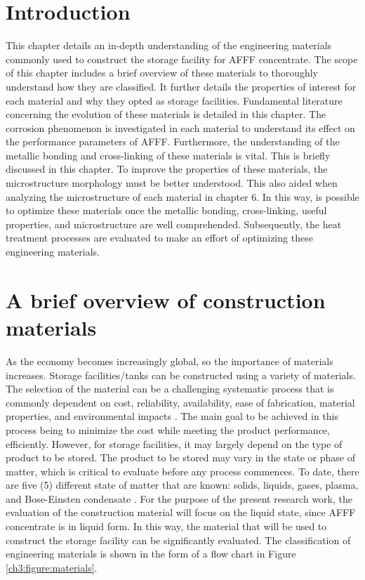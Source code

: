 \documentclass[12pt]{report}
\begin{document}
\section{Introduction}
This chapter details an in-depth understanding of the engineering materials commonly used to construct the storage facility for AFFF concentrate. The scope of this chapter includes a brief overview of these materials to thoroughly understand how they are classified. It further details the properties of interest for each material and why they opted as storage facilities.
Fundamental literature concerning the evolution of these materials is detailed in this chapter. The corrosion phenomenon is investigated in each material to understand its effect on the performance parameters of AFFF. Furthermore, the understanding of the metallic bonding and cross-linking of these materials is vital. This is briefly discussed in this chapter. To improve the properties of these materials, the microstructure morphology must be better understood. This also aided when analyzing the microstructure of each material in chapter 6. In this way, is possible to optimize these materials once the metallic bonding, cross-linking, useful properties, and microstructure are well comprehended. Subsequently, the heat treatment processes are evaluated to make an effort of optimizing these engineering materials.

\section{A brief overview of construction materials}
As the economy becomes increasingly global, so the importance of materials increases. Storage facilities/tanks can be constructed using a variety of materials. The selection of the material can be a challenging systematic process that is commonly dependent on cost, reliability, availability, ease of fabrication, material properties, and environmental impacts \cite{hench2005biomaterials}.  The main goal to be achieved in this process being to minimize the cost while meeting the product performance, efficiently. However, for storage facilities, it may largely depend on the type of product to be stored. The product to be stored may vary in the state or phase of matter, which is critical to evaluate before any process commences. To date, there are five (5) different state of matter that are known: solids, liquids, gases, plasma, and Bose-Einsten condensate \cite{ceruti2002states}. 
For the purpose of the present research work, the evaluation of the construction material will focus on the liquid state, since AFFF concentrate is in liquid form. In this way, the material that will be used to construct the storage facility can be significantly evaluated. The classification of engineering materials is shown in the form of a flow chart in Figure \ref{ch3:figure:materials}.
\end{document}
